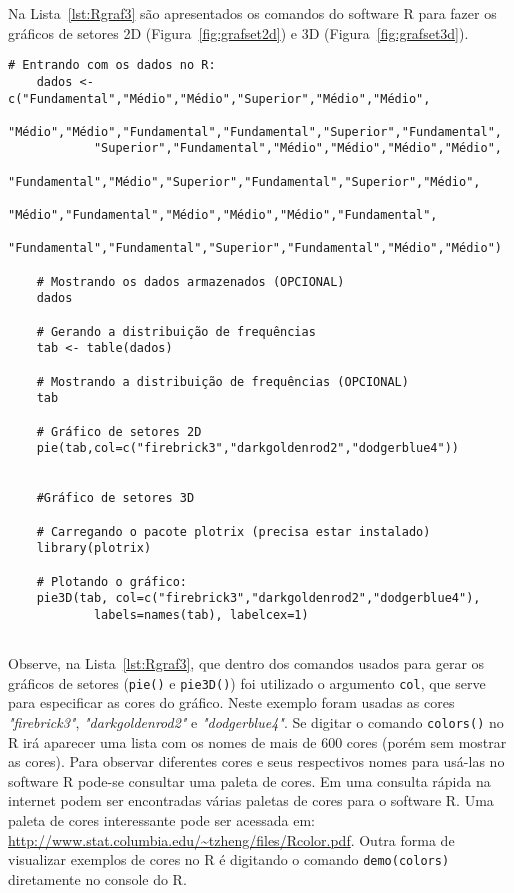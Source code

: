 \documentclass[11pt,fleqn]{book} %
\begin{document}
\vspace{0,5 cm}

Na Lista~\ref{lst:Rgraf3} são apresentados os comandos do software R para fazer os gráficos de setores 2D (Figura~\ref{fig:grafset2d}) e 3D (Figura~\ref{fig:grafset3d}).  \\


\begin{scriptsize}
	\estiloR
	\begin{lstlisting}[caption={Comandos do software R}, label=lst:Rgraf3]
	# Entrando com os dados no R:
	dados <- c("Fundamental","Médio","Médio","Superior","Médio","Médio",
			"Médio","Médio","Fundamental","Fundamental","Superior","Fundamental",
			"Superior","Fundamental","Médio","Médio","Médio","Médio",
			"Fundamental","Médio","Superior","Fundamental","Superior","Médio",
			"Médio","Fundamental","Médio","Médio","Médio","Fundamental",
			"Fundamental","Fundamental","Superior","Fundamental","Médio","Médio")
	
	# Mostrando os dados armazenados (OPCIONAL)
	dados
	
	# Gerando a distribuição de frequências
	tab <- table(dados)

	# Mostrando a distribuição de frequências (OPCIONAL)
	tab
	
	# Gráfico de setores 2D
	pie(tab,col=c("firebrick3","darkgoldenrod2","dodgerblue4"))


	#Gráfico de setores 3D
	
	# Carregando o pacote plotrix (precisa estar instalado)
	library(plotrix) 
	
	# Plotando o gráfico:
	pie3D(tab, col=c("firebrick3","darkgoldenrod2","dodgerblue4"), 
			labels=names(tab), labelcex=1)
	
	\end{lstlisting}
\end{scriptsize}

\vspace{0.3 cm}

Observe, na Lista~\ref{lst:Rgraf3}, que dentro dos comandos usados para gerar os gráficos de setores (\texttt{pie()} e \texttt{pie3D()}) foi utilizado o argumento \texttt{col}, que serve para especificar as cores do gráfico. Neste exemplo foram usadas as cores {\itshape "firebrick3"}, {\itshape "darkgoldenrod2"} e {\itshape "dodgerblue4"}. Se digitar o comando \texttt{colors()} no R irá aparecer uma lista com os nomes de mais de 600 cores (porém sem mostrar as cores). Para observar diferentes cores e seus respectivos nomes para usá-las no software R pode-se consultar uma paleta de cores. Em uma consulta rápida na internet podem ser encontradas várias paletas de cores para o software R. Uma paleta de cores interessante pode ser acessada em: \url{http://www.stat.columbia.edu/~tzheng/files/Rcolor.pdf}. Outra forma de visualizar exemplos de cores no R é digitando o comando \texttt{demo(colors)} diretamente no console do R. 
\end{document}

